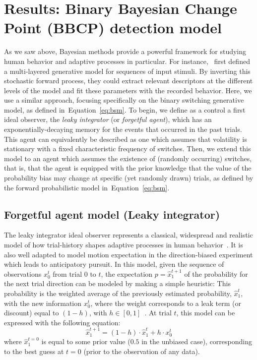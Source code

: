 \documentclass[10pt,letterpaper]{article}
\newcommand{\eql}[1]{\begin{equation}#1\end{equation}}
\newcommand{\citep}[1]{\cite{#1}}
\newcommand{\citet}[1]{\cite{#1}}
\newcommand{\seeEq}[1]{Equation~\ref{eq:#1}}
\begin{document}
\section{Results: Binary Bayesian Change Point (BBCP) detection model}
\label{sec:Bayesian_change_point}
%
%
As we saw above, Bayesian methods provide a powerful framework for studying human behavior and adaptive  processes in particular.
For instance,~\citet{Mathys11} first defined a multi-layered generative model for
sequences of input stimuli.
By inverting this stochastic forward process,
they could extract relevant descriptors at the different levels of the model
and fit these parameters with the recorded behavior.
Here, we use a similar approach, focusing specifically on the binary switching generative model,
as defined in~\seeEq{bsm}.
To begin, we define as a control a first ideal observer, the \textit{leaky integrator} (or \textit{forgetful agent}),
which has an exponentially-decaying memory for the events that occurred in the past trials.
This agent can equivalently be described as one
which assumes that volatility is stationary with a fixed characteristic frequency of switches.
Then, we extend this model to an agent
which assumes the existence of (randomly occurring) switches, that is,
that the agent is equipped with the prior knowledge
that the value of the probability bias may change
at specific (yet randomly drawn) trials,
as defined by the forward probabilistic model in~\seeEq{bsm}.
%
\subsection{Forgetful agent model (Leaky integrator)}%
The leaky integrator ideal observer represents a classical, widespread and
realistic model of how trial-history shapes
adaptive processes in human behavior~\citet{Anderson2006}.
It is also well adapted to model motion expectation in the direction-biased experiment which leads to anticipatory pursuit.
In this model, given the sequence of observations $x_0^t$ from trial $0$ to $t$,
the expectation $p=\hat{x}_1^{t+1}$ of the probability for the next trial direction can be modeled by making a simple heuristic:
This probability is the weighted average of
the previously estimated probability, $\hat{x}_1^{t}$, with the new information $x_0^t$,
where the weight corresponds to a leak term (or discount)
equal to $(1 - h)$, with $h \in [0, 1]$~\citep{Anderson2006}.
At trial $t$, this model can be expressed with the following equation:
\eql{
\hat{x}_1^{t+1} = (1 - h) \cdot \hat{x}_1^{t} + h \cdot x_0^t
\label{eq:leaky}}
where $\hat{x}_1^{t=0}$ is equal to some prior value ($0.5$ in the unbiased case),
corresponding to the best guess at $t=0$ (prior to the observation of any data).
\end{document}
